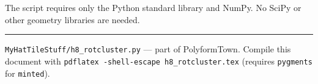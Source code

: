 \documentclass[10pt,a4paper]{article}
\newcommand{\file}[1]{\texttt{\footnotesize #1}}
\begin{document}
\medskip
\noindent The script requires only the Python standard library and NumPy.
No SciPy or other geometry libraries are needed.

\vspace{4pt}
\noindent\rule{\linewidth}{0.6pt}
\vspace{2pt}

{\small\color{gray}
\file{MyHatTileStuff/h8\_rotcluster.py} — part of PolyformTown.
Compile this document with \texttt{pdflatex -shell-escape h8\_rotcluster.tex}
(requires \texttt{pygments} for \texttt{minted}).
}
\end{document}
